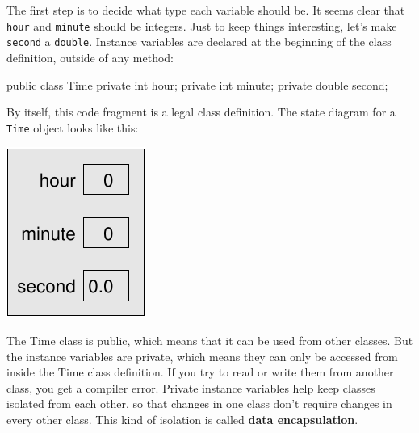 \documentclass[12pt]{book}
\makeatletter
\theoremstyle{exercise}
\newcommand{\java}[1]{\verb"#1"}
\renewcommand\subsection{\@startsection{subsection}{2}{\z@}%
    {-3.25ex\@plus -1ex \@minus -.2ex}%
    {0.3ex \@plus .2ex}%
    {\normalfont\large\bfseries}}
\newcommand{\java}[1]{\lstinline{#1}} %
\makeatother
\begin{document}
The first step is to decide what type each variable should be.
It seems clear that \java{hour} and \java{minute} should be integers.
Just to keep things interesting, let's make \java{second} a \java{double}.
Instance variables are declared at the beginning of the class definition, outside of any method:

\begin{code}
public class Time {
    private int hour;
    private int minute;
    private double second;
}
\end{code}

By itself, this code fragment is a legal class definition.
The state diagram for a \java{Time} object looks like this:

\begin{center}
\includegraphics{figs/time.pdf}
\end{center}


The Time class is public, which means that it can be used from other classes.
But the instance variables are private, which means they can only be accessed from inside the Time class definition.
If you try to read or write them from another class, you get a compiler error.
Private instance variables help keep classes isolated from each other, so that changes in one class don't require changes in every other class.
This kind of isolation is called {\bf data encapsulation}.


\end{document}
